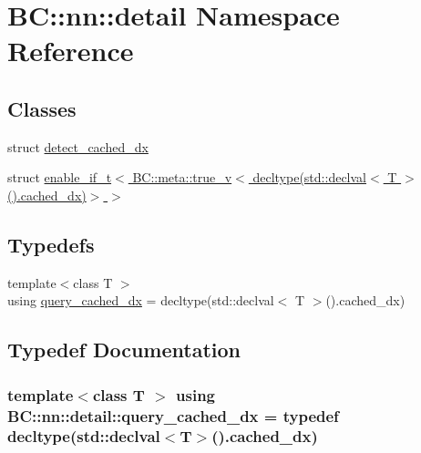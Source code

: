 \hypertarget{namespaceBC_1_1nn_1_1detail}{}\section{BC\+:\+:nn\+:\+:detail Namespace Reference}
\label{namespaceBC_1_1nn_1_1detail}
\subsection*{Classes}
\begin{DoxyCompactItemize}
\item 
struct \hyperlink{structBC_1_1nn_1_1detail_1_1detect__cached__dx}{detect\+\_\+cached\+\_\+dx}
\item 
struct \hyperlink{structBC_1_1nn_1_1detail_1_1detect__cached__dx_3_01T_00_01std_1_1enable__if__t_3_01BC_1_1meta_1_8a2dd2ab965b5bb3dbd736cde2f6a8b0}{enable\+\_\+if\+\_\+t$<$ B\+C\+::meta\+::true\+\_\+v$<$ decltype(std\+::declval$<$ T $>$().\+cached\+\_\+dx)$>$ $>$}
\end{DoxyCompactItemize}
\subsection*{Typedefs}
\begin{DoxyCompactItemize}
\item 
{\footnotesize template$<$class T $>$ }\\using \hyperlink{namespaceBC_1_1nn_1_1detail_ae9cfcb1c524209ed8e7deb0a7c5e3209}{query\+\_\+cached\+\_\+dx} = decltype(std\+::declval$<$ T $>$().cached\+\_\+dx)
\end{DoxyCompactItemize}


\subsection{Typedef Documentation}
\subsubsection[{\texorpdfstring{query\+\_\+cached\+\_\+dx}{query_cached_dx}}]{\setlength{\rightskip}{0pt plus 5cm}template$<$class T $>$ using {\bf B\+C\+::nn\+::detail\+::query\+\_\+cached\+\_\+dx} = typedef decltype(std\+::declval$<$T$>$().cached\+\_\+dx)}\hypertarget{namespaceBC_1_1nn_1_1detail_ae9cfcb1c524209ed8e7deb0a7c5e3209}{}\label{namespaceBC_1_1nn_1_1detail_ae9cfcb1c524209ed8e7deb0a7c5e3209}
